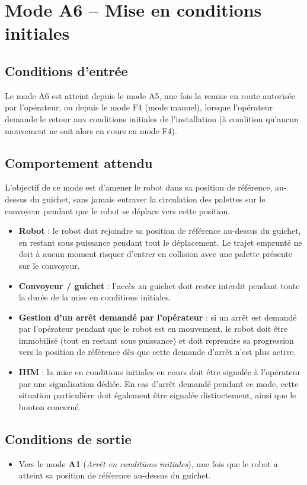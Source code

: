 \section{Mode A6 -- Mise en conditions initiales}
\label{secModeA6}

\subsection{Conditions d'entrée}

Le mode A6 est atteint depuis le mode A5, une fois la remise en route
autorisée par l'opérateur, ou depuis le mode F4 (mode manuel), lorsque
l'opérateur demande le retour aux conditions initiales de l'installation
(à condition qu'aucun mouvement ne soit alors en cours en mode F4).

\subsection{Comportement attendu}

L'objectif de ce mode est d'amener le robot dans sa position de référence,
au-dessus du guichet, sans jamais entraver la circulation des palettes sur
le convoyeur pendant que le robot se déplace vers cette position.

\begin{itemize}
    \item \textbf{Robot} : le robot doit rejoindre sa position de
    référence au-dessus du guichet, en restant sous puissance pendant tout
    le déplacement. Le trajet emprunté ne doit à aucun moment risquer
    d'entrer en collision avec une palette présente sur le convoyeur.
    \item \textbf{Convoyeur / guichet} : l'accès au guichet doit rester
    interdit pendant toute la durée de la mise en conditions initiales.
    \item \textbf{Gestion d'un arrêt demandé par l'opérateur} : si un
    arrêt est demandé par l'opérateur pendant que le robot est en
    mouvement, le robot doit être immobilisé (tout en restant sous
    puissance) et doit reprendre sa progression vers la position de
    référence dès que cette demande d'arrêt n'est plus active.
    \item \textbf{IHM} : la mise en conditions initiales en cours doit être
    signalée à l'opérateur par une signalisation dédiée. En cas d'arrêt
    demandé pendant ce mode, cette situation particulière doit également
    être signalée distinctement, ainsi que le bouton concerné.
\end{itemize}

\subsection{Conditions de sortie}

\begin{itemize}
    \item Vers le mode \textbf{A1} (\emph{Arrêt en conditions initiales}),
    une fois que le robot a atteint sa position de référence au-dessus du
    guichet.
\end{itemize}
